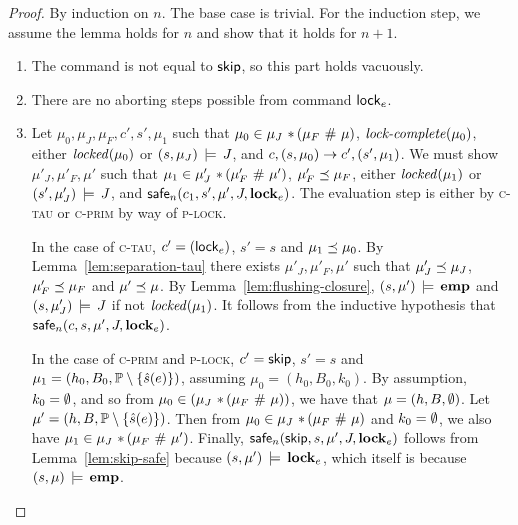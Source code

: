 \documentclass[11pt]{report}         %
\begin{document}
\begin{proof}
  By induction on $n$. The base case is trivial. For the induction step, we assume the lemma holds for $n$ and show that it holds for $n+1$.

    \begin{enumerate}
        \item The command is not equal to $\operatorname{\mathsf{skip}}$, so this part holds vacuously. 

        \item There are no aborting steps possible from command $\operatorname{\mathsf{lock}}_e$. 

        \item Let $\mu_0,\mu_J,\mu_F,c',s',\mu_1$ such that $\mu_0 \in \mu_J \operatorname{\,\ast\,} (\mu_F \operatorname{\,\#\,} \mu)$, $\text{\textit{lock-complete}}(\mu_0)$, either $\mathit{locked}(\mu_0)$ or $(s,\mu_J) \,\models\, J$, and $c,(s,\mu_0) \rightarrow c',(s',\mu_1)$. We must show $\mu'_J,\mu'_F,\mu'$ such that $\mu_1 \in \mu'_J \operatorname{\,\ast\,} (\mu'_F \operatorname{\,\#\,} \mu')$, $\mu'_F \preceq \mu_F$, either $\mathit{locked}(\mu_1)$ or $(s',\mu'_J) \,\models\, J$, and $\mathsf{safe}_{n}(c_1,s',\mu',J,\mathbf{lock}_{e})$. The evaluation step is either by \textsc{c-tau} or \textsc{c-prim} by way of \textsc{p-lock}. 

        In the case of \textsc{c-tau}, $c' = (\operatorname{\mathsf{lock}}_{e})$, $s' = s$ and $\mu_1 \preceq \mu_0$. By Lemma~\ref{lem:separation-tau} there exists $\mu'_J,\mu'_F,\mu'$ such that $\mu'_J \preceq \mu_J$, $\mu'_F \preceq \mu_F$ and $\mu' \preceq \mu$. By Lemma~\ref{lem:flushing-closure}, $(s,\mu') \,\models\, \mathbf{emp}$ and $(s,\mu'_J) \,\models\, J$ if not $\mathit{locked}(\mu_1)$. It follows from the inductive hypothesis that $\mathsf{safe}_{n}(c,s,\mu',J,\mathbf{lock}_{e})$. 

        In the case of \textsc{c-prim} and \textsc{p-lock}, $c' = \operatorname{\mathsf{skip}}$, $s' = s$ and $\mu_1 = (h_0,B_0,\mathbb{P} \setminus \left\lbrace \hat{s}(e) \right\rbrace)$, assuming $\mu_0 = (h_0,B_0,k_0)$. By assumption, $k_0 = \operatorname{\emptyset}$, and so from $\mu_0  \in (\mu_J \operatorname{\,\ast\,} (\mu_F \operatorname{\,\#\,} \mu))$, we have that $\mu = (h,B,\operatorname{\emptyset})$. Let $\mu' = (h,B,\mathbb{P} \setminus \left\lbrace \hat{s}(e) \right\rbrace)$. Then from $\mu_0 \in \mu_J \operatorname{\,\ast\,} (\mu_F \operatorname{\,\#\,} \mu)$ and $k_0 = \operatorname{\emptyset}$, we also have $\mu_1 \in \mu_J \operatorname{\,\ast\,} (\mu_F \operatorname{\,\#\,} \mu')$. Finally, $\mathsf{safe}_{n}(\operatorname{\mathsf{skip}},s,\mu',J,\mathbf{lock}_{e})$ follows from Lemma~\ref{lem:skip-safe} because $(s,\mu') \,\models\, \mathbf{lock}_{e}$, which itself is because $(s,\mu) \,\models\, \mathbf{emp}$.  

    \end{enumerate}
\end{proof}
\end{document}
